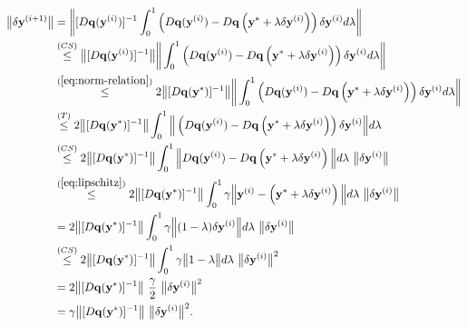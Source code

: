 \begin{equation}
\begin{split}
    \big\| \delta \mathbf{y}^{(i+1)} \big\|& = \bigg \|[D\mathbf{q}(\mathbf{y}^{(i)})]^{-1}\int_0^1 \left(D\mathbf{q}(\mathbf{y}^{(i)})-D\mathbf{q} \left(\mathbf{y}^*+\lambda\delta \mathbf{y}^{(i)}\right)\right) \delta \mathbf{y}^{(i)} d\lambda \bigg \|  \\
    & \overset{(CS)}{\le} \big \|[D\mathbf{q}(\mathbf{y}^{(i)})]^{-1}\big \|\bigg \|\int_0^1 \left(D\mathbf{q}(\mathbf{y}^{(i)})-D\mathbf{q} \left(\mathbf{y}^*+\lambda\delta \mathbf{y}^{(i)}\right)\right) \delta \mathbf{y}^{(i)} d\lambda \bigg \| \\ 
    & \overset{(\ref{eq:norm-relation})}{\le} 2\big \|[D\mathbf{q}(\mathbf{y}^*)]^{-1}\big \|\bigg \|\int_0^1 \left(D\mathbf{q}(\mathbf{y}^{(i)})-D\mathbf{q} \left(\mathbf{y}^*+\lambda\delta \mathbf{y}^{(i)}\right)\right) \delta \mathbf{y}^{(i)} d\lambda \bigg \|  \\
    & \overset{(T)}{\le} 2\big \|[D\mathbf{q}(\mathbf{y}^*)]^{-1}\big \| \int_0^1 \Big \|\left(D\mathbf{q}(\mathbf{y}^{(i)})-D\mathbf{q} \left(\mathbf{y}^*+\lambda\delta \mathbf{y}^{(i)}\right)\right) \delta \mathbf{y}^{(i)} \Big \|d\lambda    \\ 
    & \overset{(CS)}{\le} 2\big \|[D\mathbf{q}(\mathbf{y}^*)]^{-1}\big \| \int_0^1 \Big \|D\mathbf{q}(\mathbf{y}^{(i)})-D\mathbf{q} \left(\mathbf{y}^*+\lambda\delta \mathbf{y}^{(i)}\right) \Big \|d\lambda \ \big \|\delta \mathbf{y}^{(i)}\big \|   \\ 
    & \overset{(\ref{eq:lipschitz})}{\le}  2\big \|[D\mathbf{q}(\mathbf{y}^*)]^{-1}\big \| \int_0^1 \gamma \Big \| \mathbf{y}^{(i)}-\left(\mathbf{y}^*+\lambda\delta \mathbf{y}^{(i)}\right) \Big \|d\lambda \ \big \|\delta \mathbf{y}^{(i)}\big \| \\
    & =  2\big \|[D\mathbf{q}(\mathbf{y}^*)]^{-1}\big \| \int_0^1 \gamma \Big \| (1-\lambda)\delta \mathbf{y}^{(i)} \Big \|d\lambda \ \big \|\delta \mathbf{y}^{(i)}\big \| \\
    & \overset{(CS)}{\le}  2\big \|[D\mathbf{q}(\mathbf{y}^*)]^{-1}\big \| \int_0^1 \gamma \big \| 1-\lambda\big \|d\lambda \ \big \|\delta \mathbf{y}^{(i)}\big \|^2  \\
    & =  2\big \|[D\mathbf{q}(\mathbf{y}^*)]^{-1}\big \| \ \frac{\gamma}{2} \ \big \|\delta \mathbf{y}^{(i)}\big \|^2 \\
    & =  \gamma \big \|[D\mathbf{q}(\mathbf{y}^*)]^{-1}\big \|  \ \big \|\delta \mathbf{y}^{(i)}\big \|^2. 
\end{split}
\end{equation}
